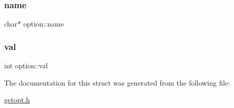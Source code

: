 \subsubsection{\texorpdfstring{name}{name}}
{\footnotesize\ttfamily char$\ast$ option\+::name}

\mbox{\label{structoption_a13bd155ec3b405d29c41ab8d0793be11}} 
\subsubsection{\texorpdfstring{val}{val}}
{\footnotesize\ttfamily int option\+::val}



The documentation for this struct was generated from the following file\+:\begin{DoxyCompactItemize}
\item 
\hyperlink{getopt_8h}{getopt.\+h}\end{DoxyCompactItemize}
